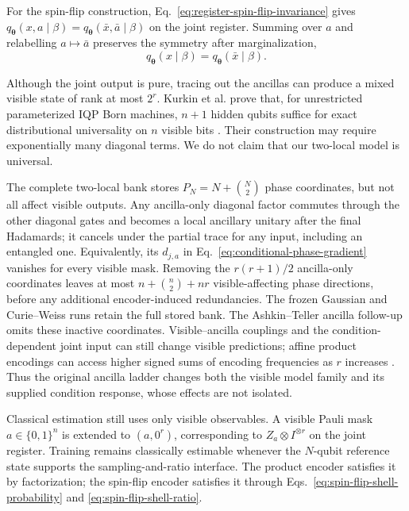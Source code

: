 \documentclass[pra,aps,10pt,twocolumn,floatfix,superscriptaddress,
notitlepage,longbibliography]{revtex4-2}
\begin{document}
For the spin-flip construction, Eq.~\eqref{eq:register-spin-flip-invariance} gives $q_{\boldsymbol{\theta}}(x,a\mid\beta)=q_{\boldsymbol{\theta}}(\bar{x},\bar{a}\mid\beta)$ on the joint register. Summing over $a$ and relabelling $a\mapsto\bar{a}$ preserves the symmetry after marginalization,
\begin{equation}
    q_{\boldsymbol{\theta}}(x\mid\beta)
    =q_{\boldsymbol{\theta}}(\bar{x}\mid\beta).
    \label{eq:visible-spin-flip-invariance}
\end{equation}

Although the joint output is pure, tracing out the ancillas can produce a mixed visible state of rank at most $2^r$. Kurkin et al. prove that, for unrestricted parameterized IQP Born machines, $n+1$ hidden qubits suffice for exact distributional universality on $n$ visible bits \cite{kurkinUniversalityKernelAdaptive2025}. Their construction may require exponentially many diagonal terms. We do not claim that our two-local model is universal.

The complete two-local bank stores $P_N=N+\binom{N}{2}$ phase coordinates, but not all affect visible outputs. Any ancilla-only diagonal factor commutes through the other diagonal gates and becomes a local ancillary unitary after the final Hadamards; it cancels under the partial trace for any input, including an entangled one. Equivalently, its $d_{j,a}$ in Eq.~\eqref{eq:conditional-phase-gradient} vanishes for every visible mask. Removing the $r(r+1)/2$ ancilla-only coordinates leaves at most $n+\binom n2+nr$ visible-affecting phase directions, before any additional encoder-induced redundancies. The frozen Gaussian and Curie--Weiss runs retain the full stored bank. The Ashkin--Teller ancilla follow-up omits these inactive coordinates. Visible--ancilla couplings and the condition-dependent joint input can still change visible predictions; affine product encodings can access higher signed sums of encoding frequencies as $r$ increases \cite{schuldEffectDataEncoding2021,casasMultidimensionalFourier2023}. Thus the original ancilla ladder changes both the visible model family and its supplied condition response, whose effects are not isolated.

Classical estimation still uses only visible observables. A visible Pauli mask $a\in\{0,1\}^n$ is extended to $(a,0^r)$, corresponding to $Z_a\otimes I^{\otimes r}$ on the joint register. Training remains classically estimable whenever the $N$-qubit reference state supports the sampling-and-ratio interface. The product encoder satisfies it by factorization; the spin-flip encoder satisfies it through Eqs.~\eqref{eq:spin-flip-shell-probability} and \eqref{eq:spin-flip-shell-ratio}.
\end{document}
